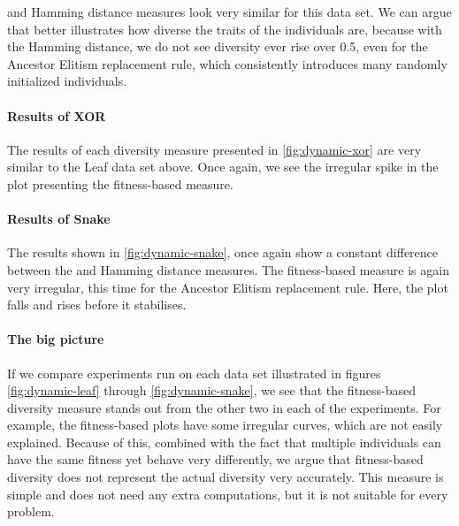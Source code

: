 \dia{} and Hamming distance measures look very similar for this data set. We can argue that \dia{} better illustrates how diverse the traits of the individuals are, because with the Hamming distance, we do not see diversity ever rise over \num{0.5}, even for the Ancestor Elitism replacement rule, which consistently introduces many randomly initialized individuals. 



\paragraph{Results of XOR} The results of each diversity measure presented in \cref{fig:dynamic-xor} are very similar to the Leaf data set above. Once again, we see the irregular spike in the plot presenting the fitness-based measure. %



\paragraph{Results of Snake} The results shown in \cref{fig:dynamic-snake}, once again show a constant difference between the \dia{} and Hamming distance measures. The fitness-based measure is again very irregular, this time for the Ancestor Elitism replacement rule. Here, the plot falls and rises before it stabilises.



\paragraph{The big picture} If we compare experiments run on each data set illustrated in figures \ref{fig:dynamic-leaf} through \ref{fig:dynamic-snake}, we see that the fitness-based diversity measure stands out from the other two in each of the experiments. For example, the fitness-based plots have some irregular curves, which are not easily explained. Because of this, combined with the fact that multiple individuals can have the same fitness yet behave very differently, we argue that fitness-based diversity does not represent the actual diversity very accurately. This measure is simple and does not need any extra computations, but it is not suitable for every problem. 


